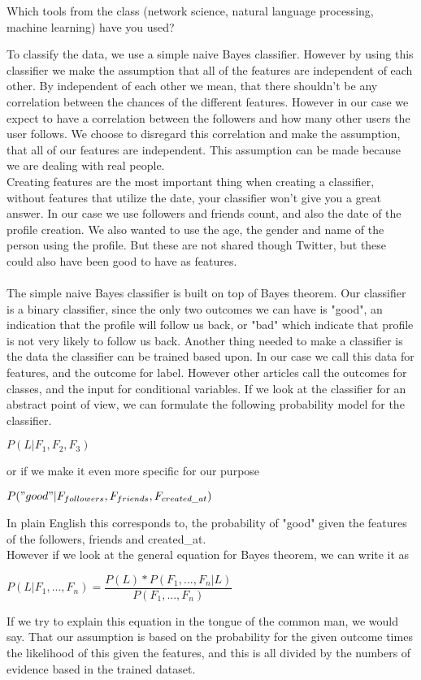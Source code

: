 Which tools from the class (network science, natural language processing, machine learning) have you used? 

To classify the data, we use a simple naive Bayes classifier. However by using this classifier we make the assumption that all of the features are independent of each other. By independent of each other we mean, that there shouldn't be any correlation between the chances of the different features. However in our case we expect to have a correlation between the followers and how many other users the user follows. We choose to disregard this correlation and make the assumption, that all of our features are independent. This assumption can be made because we are dealing with real people.\\
Creating features are the most important thing when creating a classifier, without features that utilize the date, your classifier won't give you a great answer. In our case we use followers and friends count, and also the date of the profile creation. We also wanted to use the age, the gender and name of the person using the profile. But these are not shared though Twitter, but these could also have been good to have as features.\\
\\
The simple naive Bayes classifier is built on top of Bayes theorem. Our classifier is a binary classifier, since the only two outcomes we can have is "good", an indication that the profile will follow us back, or "bad" which indicate that profile is not very likely to follow us back. Another thing needed to make a classifier is the data the classifier can be trained based upon. In our case we call this data for features, and the outcome for label. However other articles call the outcomes for classes, and the input for conditional variables. If we look at the classifier for an abstract point of view, we can formulate the following probability model for the classifier.
\begin{center}
	$P(L|F_{1},F_{2},F_{3})$
\end{center}
or if we make it even more specific for our purpose
\begin{center}
	$P("good"|F_{followers},F_{friends},F_{created\_at})$
\end{center}
In plain English this corresponds to, the probability of "good" given the features of the followers, friends and created\_at.\\
However if we look at the general equation for Bayes theorem, we can write it as
\begin{center}
	$P(L|F_{1},...,F_{n}) = \dfrac{P(L)*P(F_{1},...,F_{n}|L)}{P(F_{1},...,F_{n})} $
\end{center}

If we try to explain this equation in the tongue of the common man, we would say. That our assumption is based on the probability for the given outcome times the likelihood of this given the features, and this is all divided by the numbers of evidence based in the trained dataset.
